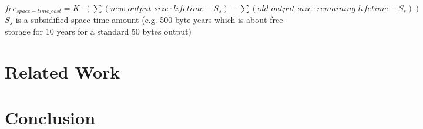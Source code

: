 \documentclass[]{article}   %
\newcommand{\authnote}[2]{\marginpar{\parbox{\marginparwidth}{\tiny %
  \textsf{#1 {\textcolor{blue}{notes: #2}}}}}%
  \textcolor{blue}{\textbf{\dag}}}
\newcommand{\authnote}[2]{
  \textsf{#1 \textcolor{blue}{: #2}}}
\newcommand{\authnote}[2]{}
\newcommand{\dnote}[1]{{\authnote{\textcolor{blue}{Dima notes}}{#1}}}
\begin{document}
\dnote{describe like possible optimization}

$fee_{space-time\_cost} = K \cdot (\sum{(new\_output\_size \cdot lifetime - S_s)} - \sum{(old\_output\_size \cdot remaining\_lifetime - S_s)})$
$S_s$ is a subsidified space-time amount (e.g. 500 byte-years which is about free storage for 10 years for a standard 50 bytes output)



\section{Related Work}

\section{Conclusion}



\end{document}
